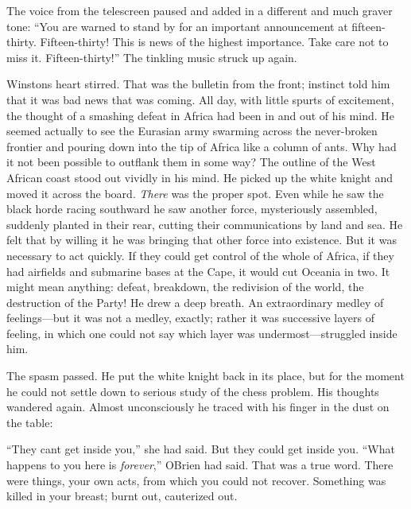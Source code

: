 The voice from the telescreen paused and added in a different and much
graver tone: ``You are warned to stand by for an important announcement
at fifteen-thirty. Fifteen-thirty! This is news of the highest
importance. Take care not to miss it. Fifteen-thirty!'' The tinkling
music struck up again.

Winston\textquotesingle s heart stirred. That was the bulletin from the
front; instinct told him that it was bad news that was coming. All day,
with little spurts of excitement, the thought of a smashing defeat in
Africa had been in and out of his mind. He seemed actually to see the
Eurasian army swarming across the never-broken frontier and pouring down
into the tip of Africa like a column of ants. Why had it not been
possible to outflank them in some way? The outline of the West African
coast stood out vividly in his mind. He picked up the white knight and
moved it across the board. \emph{There} was the proper spot. Even while
he saw the black horde racing southward he saw another force,
mysteriously assembled, suddenly planted in their rear, cutting their
communications by land and sea. He felt that by willing it he was
bringing that other force into existence. But it was necessary to act
quickly. If they could get control of the whole of Africa, if they had
airfields and submarine bases at the Cape, it would cut Oceania in two.
It might mean anything: defeat, breakdown, the redivision of the world,
the destruction of the Party! He drew a deep breath. An extraordinary
medley of feelings---but it was not a medley, exactly; rather it was
successive layers of feeling, in which one could not say which layer was
undermost---struggled inside him.

The spasm passed. He put the white knight back in its place, but for the
moment he could not settle down to serious study of the chess problem.
His thoughts wandered again. Almost unconsciously he traced with his
finger in the dust on the table:


``They can\textquotesingle t get inside you,'' she had said. But they
could get inside you. ``What happens to you here is \emph{forever},''
O\textquotesingle Brien had said. That was a true word. There were
things, your own acts, from which you could not recover. Something was
killed in your breast; burnt out, cauterized out.

